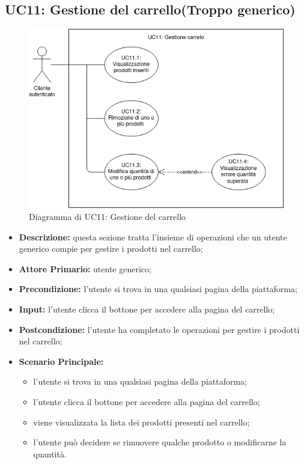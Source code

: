\subsection{UC11: Gestione del carrello(\textbf{Troppo generico})}
\label{sec:UC11}
\begin{figure}[!ht]
    \caption{Diagramma di UC11: Gestione del carrello}
    \vspace{10px}
    \includegraphics[scale=0.5]{../../../Images/AnalisiRequisiti/UC11}
    \centering
\end{figure}
\begin{itemize}
    \item \textbf{Descrizione:} questa sezione tratta l'insieme di operazioni che un utente generico compie per gestire i prodotti nel carrello;
    \item \textbf{Attore Primario:} utente generico;
    \item \textbf{Precondizione:} l'utente si trova in una qualsiasi pagina della piattaforma;
    \item \textbf{Input:} l'utente clicca il bottone per accedere alla pagina del carrello;
    \item \textbf{Postcondizione:} l'utente ha completato le operazioni per gestire i prodotti nel carrello;
    \item \textbf{Scenario Principale:}
          \begin{itemize}
              \item l'utente si trova in una qualsiasi pagina della piattaforma;
              \item l'utente clicca il bottone per accedere alla pagina del carrello;
              \item viene visualizzata la lista dei prodotti presenti nel carrello;
              \item l'utente può decidere se rimuovere qualche prodotto o modificarne la quantità.
          \end{itemize}
\end{itemize}
